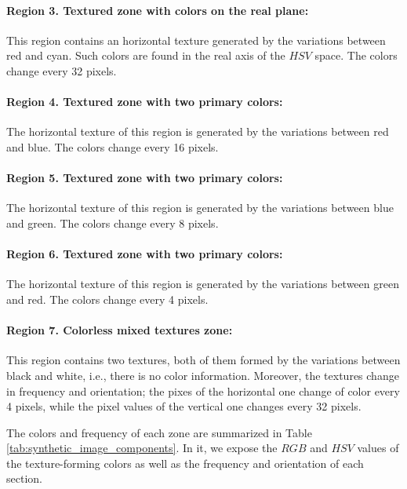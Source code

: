 \paragraph{Region 3. Textured zone with colors on the real plane:}
This region contains an horizontal texture generated by the variations between red and cyan. Such colors are found in the real axis of the $HSV$ space. The colors change every 32 pixels.

\paragraph{Region 4. Textured zone with two primary colors:}
The horizontal texture of this region is generated by the variations between red and blue. The colors change every 16 pixels. 

\paragraph{Region 5. Textured zone with two primary colors:}
The horizontal texture of this region is generated by the variations between blue and green. The colors change every 8 pixels. 

\paragraph{Region 6. Textured zone with two primary colors:}
The horizontal texture of this region is generated by the variations between green and red. The colors change every 4 pixels.

\paragraph{Region 7. Colorless mixed textures zone:}
This region contains two textures, both of them formed by the variations between black and white, i.e., there is no color information. Moreover, the textures change in frequency and orientation; the pixes of the horizontal one change of color every 4 pixels, while the pixel values of the vertical one changes every 32 pixels.

The colors and frequency of each zone are summarized in Table \ref{tab:synthetic_image_components}. In it, we expose the $RGB$ and $HSV$ values of the texture-forming colors as well as the frequency and orientation of each section.

